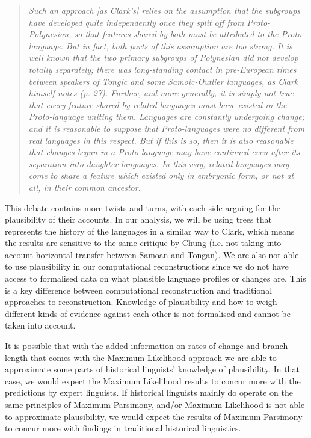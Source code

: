 \documentclass[draft,10pt]{article} %
\begin{document}
\begin{quotation}
\noindent\emph{Such an approach [as Clark's] relies on the assumption that the subgroups have developed quite independently once they split off from Proto-Polynesian, so that features shared by both must be attributed to the Proto-language. But in fact, both parts of this assumption are too strong. It is well known that the two primary subgroups of Polynesian did not develop totally separately; there was long-standing contact in pre-European times between speakers of Tongic and some Samoic-Outlier languages, as Clark himself notes (p. 27). Further, and more generally, it is simply not true that every feature shared by related languages must have existed in the Proto-language uniting them. Languages are constantly undergoing change; and it is reasonable to suppose that Proto-languages were no different from real languages in this respect. But if this is so, then it is also reasonable that changes begun in a Proto-language may have continued even after its separation into daughter languages. In this way, related languages may come to share a feature which existed only in embryonic form, or not at all, in their common ancestor.}
\end{quotation}
\begin{flushright} \citet[539]{chung1977aspects}  \end{flushright}

This debate contains more twists and turns, with each side arguing for the plausibility of their accounts. In our analysis, we will be using trees that represents the history of the languages in a similar way to Clark, which means the results are sensitive to the same critique by Chung (i.e. not taking into account horizontal transfer between S\={a}moan and Tongan). We are also not able to use plausibility in our computational reconstructions since we do not have access to formalised data on what plausible language profiles or changes are. This is a key difference between computational reconstruction and traditional approaches to reconstruction. Knowledge of plausibility and how to weigh different kinds of evidence against each other is not formalised and cannot be taken into account.

It is possible that with the added information on rates of change and branch length that comes with the Maximum Likelihood approach we are able to approximate some parts of historical linguists' knowledge of plausibility. In that case, we would expect the Maximum Likelihood results to concur more with the predictions by expert linguists. If historical linguists mainly do operate on the same principles of Maximum Parsimony, and/or Maximum Likelihood is not able to approximate plausibility, we would expect the results of Maximum Parsimony to concur more with findings in traditional historical linguistics.
\end{document}
